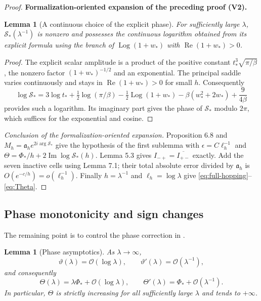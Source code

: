 \documentclass[11pt]{article}
\newtheorem{lemma}[theorem]{Lemma}
\newcommand{\formalisationparentid}{X}
\newenvironment{formalisationaddition}[1]{\par\medskip\begingroup\color{blue}\def\formalisationparentid{#1}\setcounter{formalizationsublemma}{0}\let\lemma\formalizationsublemma\let\endlemma\endformalizationsublemma
  \def\Eo{\mathcal E_h^\circ}\def\EE{\mathcal E_h}\def\phio{\phi_h^\circ}\def\phih{\phi_h}\def\Ho{H_h^{\rm atom}(v^\circ)}\def\Ha{H_h^{\rm atom}}\def\HL{H_h^{L}}\def\Dh{D_h}\def\Log{\operatorname{Log}}\def\ellh{\ell_h}\def\Gp{G_{p,h}}\def\Ast{A_{*,h}}\def\ahat{\widehat{\mathfrak a}_h}\def\ah{\mathfrak a_h}\def\rh{\widehat\rho_h}\def\deltah{\widehat\delta_h}\def\oldref##1{\textup{(##1)}}\def\interface##1{\par\noindent\textit{Analytical interface used here.} ##1\par}\def\finish{\par\noindent\textit{Conclusion of the formalization-oriented expansion.} }\par\noindent\textbf{Formalization-oriented expansion of the preceding proof (V2).}\par\smallskip
}{\par\endgroup\medskip
}
\newcommand{\cO}{\mathcal O}
\newcommand{\Rea}{\operatorname{Re}}
\newcommand{\Ima}{\operatorname{Im}}
\begin{document}
\begin{proof}
\begin{formalisationaddition}{T7.2}
\begin{lemma}[A continuous choice of the explicit phase]\label{sublemma:T7-2-phase}
For sufficiently large $\lambda$, $\mathcal S_*(\lambda^{-1})$ is nonzero and possesses the continuous logarithm obtained from its explicit formula using the branch of $\Log(1+w_*)$ with $\Rea(1+w_*)>0$.
\end{lemma}
\begin{proof}
The explicit scalar amplitude is a product of the positive constant $t_*^3\sqrt{\pi/\beta}$, the nonzero factor $(1+w_*)^{-1/2}$ and an exponential. The principal saddle varies continuously and stays in $\Rea(1+w_*)>0$ for small $h$. Consequently
\[
 \log \mathcal S_* =3\log t_*+\tfrac12\log(\pi/\beta)
 -\tfrac12\Log(1+w_*)-\beta(w_*^2+2w_*)+\frac9{4\beta}
\]
provides such a logarithm. Its imaginary part gives the phase of $\mathcal S_*$ modulo $2\pi$, which suffices for the exponential and cosine.
\end{proof}
\finish Proposition 6.8 and $M_h=\ah e^{2i\arg \mathcal S_*}$ give the hypothesis of the first sublemma with $\epsilon=C\ellh^{-1}$ and $\Theta=\Phi_*/h+2\Ima\log \mathcal S_*(h)$. Lemma 5.3 gives $I_{-+}=\overline{I_{+-}}$ exactly. Add the seven inactive cells using Lemma 7.1; their total absolute error divided by $\ah$ is $O(e^{-c/h})=o(\ellh^{-1})$. Finally $h=\lambda^{-1}$ and $\ellh=\log\lambda$ give \eqref{eq:full-hopping}--\eqref{eq:Theta}.
\end{formalisationaddition}

\end{proof}

\subsection{Phase monotonicity and sign changes}\label{sec:phase-monotonicity}
The remaining point is to control the phase correction in .

\begin{lemma}[Phase asymptotics]\label{lem:phase-asymptotics}
As $\lambda\to\infty$,
\begin{equation}\label{eq:vartheta-bounds}
 \vartheta(\lambda)=\cO(\log\lambda),
 \qquad
 \vartheta'(\lambda)=\cO(\lambda^{-1}),
\end{equation}
and consequently
\begin{equation}\label{eq:phase-derivative}
 \Theta(\lambda)=\lambda\Phi_*+\cO(\log\lambda),
 \qquad
 \Theta'(\lambda)=\Phi_*+\cO(\lambda^{-1}).
\end{equation}
In particular, $\Theta$ is strictly increasing for all sufficiently large
$\lambda$ and tends to $+\infty$.
\end{lemma}
\end{document}
